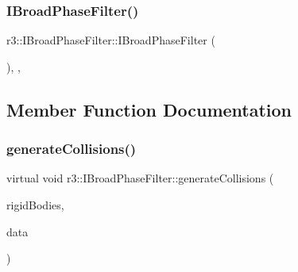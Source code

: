 \mbox{\label{classr3_1_1_i_broad_phase_filter_ab1eb5dc44548078aa0716eedbab8ac11}} 
\subsubsection{\texorpdfstring{I\+Broad\+Phase\+Filter()}{IBroadPhaseFilter()}}
{\footnotesize\ttfamily r3\+::\+I\+Broad\+Phase\+Filter\+::\+I\+Broad\+Phase\+Filter (\begin{DoxyParamCaption}{ }\end{DoxyParamCaption})\hspace{0.3cm}{\ttfamily [explicit]}, {\ttfamily [protected]}, {\ttfamily [default]}}



\subsection{Member Function Documentation}
\mbox{\label{classr3_1_1_i_broad_phase_filter_a5f437f6390a8f10bf96d72e35e3b4432}} 
\subsubsection{\texorpdfstring{generate\+Collisions()}{generateCollisions()}}
{\footnotesize\ttfamily virtual void r3\+::\+I\+Broad\+Phase\+Filter\+::generate\+Collisions (\begin{DoxyParamCaption}\item[{const std\+::vector$<$ \mbox{\hyperlink{classr3_1_1_rigid_body}{Rigid\+Body}} $\ast$$>$ \&}]{rigid\+Bodies,  }\item[{\mbox{\hyperlink{classr3_1_1_fixed_size_container}{Fixed\+Size\+Container}}$<$ \mbox{\hyperlink{classr3_1_1_collision_pair}{Collision\+Pair}} $>$ \&}]{data }\end{DoxyParamCaption})\hspace{0.3cm}{\ttfamily [pure virtual]}}

